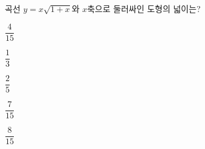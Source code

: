 \hspace*{2mm}\begin{minipage}[t]{\dimexpr\linewidth-2mm\relax}\vspace{0pt}
곡선 $y=x\sqrt{1+x}$와 $x$축으로 둘러싸인 도형의 넓이는?
\begin{choices32}{\rule[-3ex]{0pt}{8ex}$\dfrac{4}{15}$}{\rule[-3ex]{0pt}{8ex}$\dfrac{1}{3}$}{\rule[-3ex]{0pt}{8ex}$\dfrac{2}{5}$}{\rule[-3ex]{0pt}{8ex}$\dfrac{7}{15}$}{\rule[-3ex]{0pt}{8ex}$\dfrac{8}{15}$}\end{choices32}\end{minipage}
